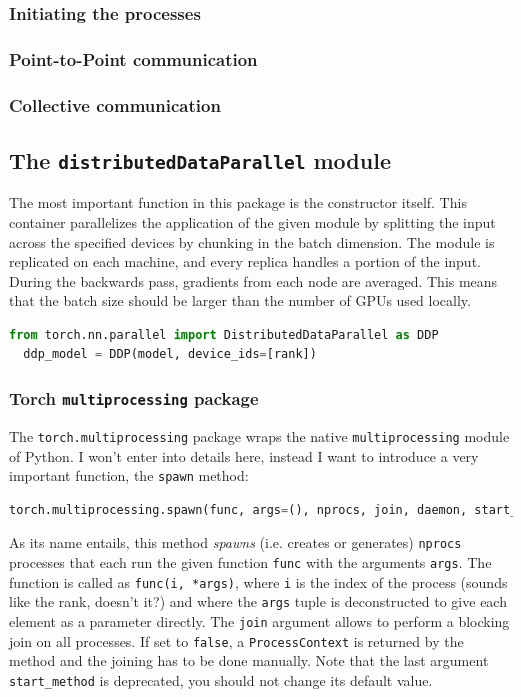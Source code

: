 \documentclass{article}
\begin{document}
\subsubsection{Initiating the processes}

\subsubsection{Point-to-Point communication}

\subsubsection{Collective communication}

\subsection{The \texorpdfstring{\lstinline{distributedDataParallel}}{distributedDataParallel} module}
The most important function in this package is the constructor itself. This container parallelizes the application of the given module by splitting the input across the specified devices by chunking in the batch dimension. The module is replicated on each machine, and every replica handles a portion of the input. During the backwards pass, gradients from each node are averaged. This means that the batch size should be larger than the number of GPUs used locally.

\begin{lstlisting}[language=Python]
  from torch.nn.parallel import DistributedDataParallel as DDP
  ddp_model = DDP(model, device_ids=[rank])
\end{lstlisting}

\subsubsection{Torch \texorpdfstring{\lstinline{multiprocessing}}{multiprocessing} package}
The \lstinline{torch.multiprocessing} package wraps the native \lstinline{multiprocessing} module of Python. I won't enter into details here, instead I want to introduce a very important function, the \lstinline{spawn} method:
\begin{lstlisting}[language=Python]
  torch.multiprocessing.spawn(func, args=(), nprocs, join, daemon, start_method='spawn')
\end{lstlisting}
As its name entails, this method \textit{spawns} (i.e. creates or generates) \lstinline{nprocs} processes that each run the given function \lstinline{func} with the arguments \lstinline{args}. The function is called as \lstinline{func(i, *args)}, where \lstinline{i} is the index of the process (sounds like the rank, doesn't it?) and where the \lstinline{args} tuple is deconstructed to give each element as a parameter directly. The \lstinline{join} argument allows to perform a blocking join on all processes. If set to \lstinline{false}, a \lstinline{ProcessContext} is returned by the method and the joining has to be done manually. Note that the last argument \lstinline{start_method} is deprecated, you should not change its default value.
\end{document}
